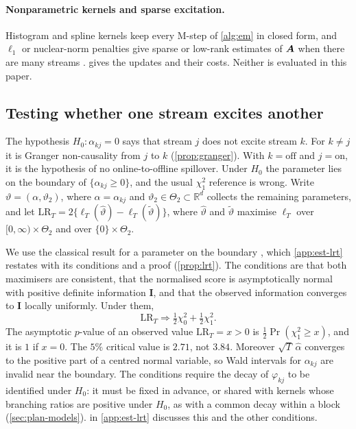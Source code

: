 \paragraph{Nonparametric kernels and sparse excitation.} Histogram and spline kernels
\citep{marsan2008,lewis2011} keep every M-step of \cref{alg:em} in closed form, and
$\ell_1$ or nuclear-norm penalties give sparse or low-rank estimates of $\bm{A}$ when there
are many streams \citep{hansen2015,zhou2013}.  gives the updates and
their costs. Neither is evaluated in this paper.

\subsection{Testing whether one stream excites another}\label{sec:est-lrt}

The hypothesis $H_0:\alpha_{kj}=0$ says that stream $j$ does not excite stream $k$. For
$k\ne j$ it is Granger non-causality from $j$ to $k$ (\cref{prop:granger}). With
$k=\mathrm{off}$ and $j=\mathrm{on}$, it is the hypothesis of no online-to-offline
spillover. Under $H_0$ the parameter lies on the boundary of $\{\alpha_{kj}\ge0\}$, and the
usual $\chi^2_1$ reference is wrong. Write $\vartheta=(\alpha,\vartheta_2)$, where
$\alpha=\alpha_{kj}$ and $\vartheta_2\in\Theta_2\subset\mathbb R^d$ collects the remaining
parameters, and let $\mathrm{LR}_T=2\{\ell_T(\hat\vartheta)-\ell_T(\tilde\vartheta)\}$, where
$\hat\vartheta$ and $\tilde\vartheta$ maximise $\ell_T$ over $[0,\infty)\times\Theta_2$ and
over $\{0\}\times\Theta_2$.

We use the classical result for a parameter on the boundary
\citep{chernoff1954,self1987}, which \cref{app:est-lrt} restates with its conditions and a
proof (\cref{prop:lrt}). The conditions are that both maximisers are consistent, that the
normalised score is asymptotically normal with positive definite information $\bm I$, and
that the observed information converges to $\bm I$ locally uniformly. Under them,
\begin{equation}\label{eq:est-chibar}
  \mathrm{LR}_T\Rightarrow\tfrac12\chi^2_0+\tfrac12\chi^2_1 .
\end{equation}
The asymptotic $p$-value of an observed value $\mathrm{LR}_T=x>0$ is
$\tfrac12\Pr(\chi^2_1\ge x)$, and it is $1$ if $x=0$. The $5\%$ critical value is $2.71$,
not $3.84$. Moreover $\sqrt T\,\hat\alpha$ converges to the positive part of a centred
normal variable, so Wald intervals for $\alpha_{kj}$ are invalid near the boundary.
The conditions require the decay of $\varphi_{kj}$ to be identified under $H_0$: it must be
fixed in advance, or shared with kernels whose branching ratios are positive under $H_0$,
as with a common decay within a block (\cref{sec:plan-models}).  in
\cref{app:est-lrt} discusses this and the other conditions.

